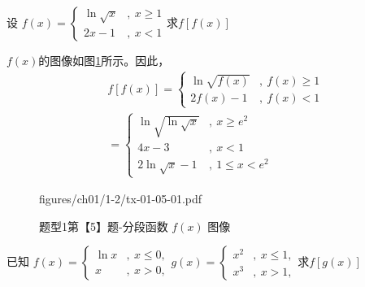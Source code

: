 \begin{Problem}
    设 $
        f(x)=\begin{cases}
            \ln \sqrt{x}&,\ x \ge 1\\
            2x-1&,\ x <1
        \end{cases}
    $求$f[f(x)]$
\end{Problem}
\begin{Answer}
    $f(x)$的图像如图\ref{fig:ch01-1-2-tx-01-05-01}所示。因此，
    \begin{align*}
        &f[f(x)]=\begin{cases}
            \ln\sqrt{f(x)}&,\ f(x) \ge 1\\
            2f(x) -1&,\ f(x) < 1
        \end{cases}\\
        &=\begin{cases}
            \ln\sqrt{\ln \sqrt{x}}&,\ x \ge e^2\\
            4x-3&,\ x < 1\\
            2\ln\sqrt{x}-1&,\ 1 \le x < e^2
        \end{cases}
    \end{align*}
    \begin{figure}[htbp]
        \centering
        \begin{includegraphics}[width =0.8 \textwidth]
            {figures/ch01/1-2/tx-01-05-01.pdf}
        \end{includegraphics}
        \caption{题型1第【5】题-分段函数 $f(x)$ 图像}
        \label{fig:ch01-1-2-tx-01-05-01}
    \end{figure}
\end{Answer}
\begin{Problem}
    已知 $
        f(x)=\begin{cases}
            \ln x&,\ x \le 0,\\
            x&,\ x >0,
        \end{cases}g(x)=\begin{cases}
            x^2&,\ x \le 1,\\
            x^3&,\ x > 1,
        \end{cases}
    $求$f[g(x)]$
\end{Problem}
